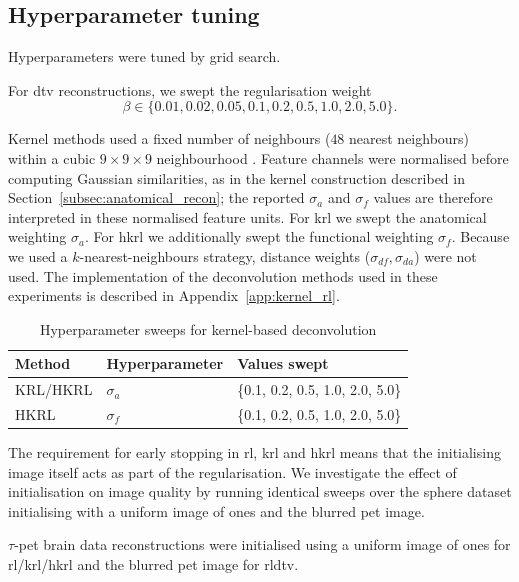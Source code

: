 \subsection{Hyperparameter tuning}
\label{subsec:hyperparameter_tuning}

Hyperparameters were tuned by grid search.

For \gls{dtv} reconstructions, we swept the regularisation weight
\[
\beta\in\{0.01, 0.02, 0.05, 0.1, 0.2, 0.5, 1.0, 2.0, 5.0\}.
\]

Kernel methods used a fixed number of neighbours ($48$ nearest neighbours) within a cubic $9\times9\times9$ neighbourhood \cite{hutchcroftAnatomicallyaidedPETReconstruction2016}. Feature channels were normalised before computing Gaussian similarities, as in the kernel construction described in Section~\ref{subsec:anatomical_recon}; the reported $\sigma_a$ and $\sigma_f$ values are therefore interpreted in these normalised feature units. For \gls{krl} we swept the anatomical weighting $\sigma_a$. For \gls{hkrl} we additionally swept the functional weighting $\sigma_f$. Because we used a $k$-nearest-neighbours strategy, distance weights ($\sigma_{df}, \sigma_{da}$) were not used. The implementation of the deconvolution methods used in these experiments is described in Appendix~\ref{app:kernel_rl}.

\begin{table}[hbtp]
\centering
\caption{Hyperparameter sweeps for kernel-based deconvolution}
\label{tab:kernel_sweeps}
\begin{tabular}{lll}
\toprule
Method & Hyperparameter & Values swept \\
\midrule
KRL/HKRL & $\sigma_{a}$ & \{0.1, 0.2, 0.5, 1.0, 2.0, 5.0\} \\
HKRL & $\sigma_{f}$ & \{0.1, 0.2, 0.5, 1.0, 2.0, 5.0\} \\
\bottomrule
\end{tabular}
\end{table}

The requirement for early stopping in \gls{rl}, \gls{krl} and \gls{hkrl} means that the initialising image itself acts as part of the regularisation. We investigate the effect of initialisation on image quality by running identical sweeps over the sphere dataset initialising with a uniform image of ones and the blurred \gls{pet} image.

$\tau$-\gls{pet} brain data reconstructions were initialised using a uniform image of ones for \gls{rl}/\gls{krl}/\gls{hkrl} and the blurred \gls{pet} image for \gls{rldtv}.

